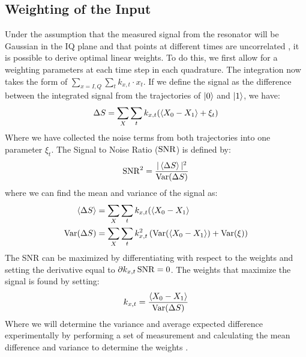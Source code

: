 \subsection{Weighting of the Input}
Under the assumption that the measured signal from the resonator will be Gaussian in the IQ plane and that points at different times are uncorrelated \cite{magesan_machine_2015},  it is possible to derive optimal linear weights. To do this, we first allow for a weighting parameters at each time step in each quadrature. The integration now takes the form of $\sum_{x = I, Q}\sum_t k_{x, t} \cdot x_t$. If we define the signal as the difference between the integrated signal from the trajectories of $\ket{0}$ and $\ket{1}$, we have:
\begin{equation}
    \Delta S = \sum_X \sum_t k_{x, t} (\expval{X_0 - X_1} + \xi_t)
\end{equation}
Where we have collected the noise terms from both trajectories into one parameter $\xi_t$. The Signal to Noise Ratio ($\operatorname{SNR}$) is defined by: %
\begin{equation}
    \operatorname{SNR}^2 = \frac{|\expval{\Delta S}|^2}{\operatorname{Var}(\Delta S)} 
\end{equation}
where we can find the mean and variance of the signal as:
\begin{align}
    \expval{\Delta S} &= \sum_X \sum_t k_{x, t} (\expval{X_0 - X_1} \\
    \operatorname{Var}(\Delta S) &= \sum_X \sum_t k_{x, t}^2 \left( \operatorname{Var}(\expval{X_0 - X_1}) + \operatorname{Var}(\xi) \right)
\end{align}
The SNR can be maximized by differentiating with respect to the weights and setting the derivative equal to $\partial k_{x, t} \operatorname{SNR} = 0$. The weights that maximize the signal is found by  setting:
\begin{equation}
    k_{x, t} = \frac{\expval{X_0 - X_1}}{\operatorname{Var}(\Delta S)}
\end{equation}
Where we will determine the variance and average expected difference experimentally by performing a set of measurement and calculating the mean difference and variance to determine the weights \cite{ryan_tomography_2015}.

